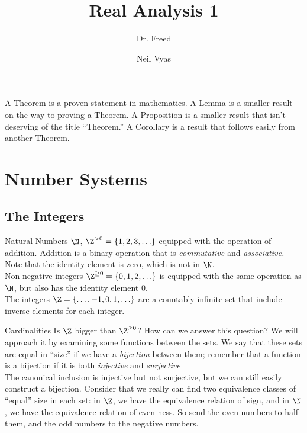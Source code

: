 \documentclass{notes}
\title{Real Analysis 1}
\subtitle{Dr. Freed}
\author{Neil Vyas}
\begin{document}
\maketitle
\tableofcontents

A Theorem is a proven statement in mathematics.
A Lemma is a smaller result on the way to proving a Theorem.
A Proposition is a smaller result that isn't deserving of the title ``Theorem.''
A Corollary is a result that follows easily from another Theorem.

\section{Number Systems}
\subsection{The Integers} %
Natural Numbers $\N$, $\Z^{>0} = \{1, 2, 3, \ldots\}$ equipped with the operation of addition.
Addition is a binary operation that is \emph{commutative} and \emph{associative.} Note that the 
identity element is zero, which is not in $\N$. \\

Non-negative integers $\Z^{\geq 0} = \{0 , 1, 2, \ldots\}$ is equipped with the same operation as 
$\N$, but also has the identity element 0. \\

The integers $\Z = \{\ldots, -1, 0, 1, \ldots\}$ are a countably infinite set that include inverse
elements for each integer. \\

\begin{aside}{Cardinalities}
Is $\Z$ bigger than $\Z^{\geq 0}$? How can we answer this question? We will approach it by examining 
some functions between the sets. We say that these sets are equal in ``size'' if we have a \emph{bijection}
between them; remember that a function is a bijection if it is both \emph{injective} and \emph{surjective}\\

The canonical inclusion is injective but not surjective, but we can still easily construct a bijection.
Consider that we really can find two equivalence classes of ``equal'' size in each set: in $\Z$, we have
the equivalence relation of sign, and in $\N$, we have the equivalence relation of even-ness. So send
the even numbers to half them, and the odd numbers to the negative numbers. \\
\end{aside}
\end{document}
